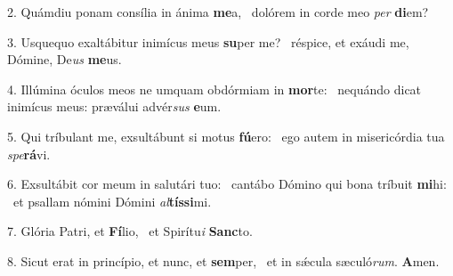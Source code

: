 2. Quámdiu ponam consília in ánima \textbf{me}a, \ast\  dolórem in corde meo \textit{per} \textbf{di}em?\

3. Usquequo exaltábitur inimícus meus \textbf{su}per me? \ast\  réspice, et exáudi me, Dómine, De\textit{us} \textbf{me}us.\

4. Illúmina óculos meos ne umquam obdórmiam in \textbf{mor}te: \ast\  nequándo dicat inimícus meus: præválui advér\textit{sus} \textbf{e}um.\

5. Qui tríbulant me, exsultábunt si motus \textbf{fú}ero: \ast\  ego autem in misericórdia tua \textit{spe}\textbf{rá}vi.\

6. Exsultábit cor meum in salutári tuo: \dag\  cantábo Dómino qui bona tríbuit \textbf{mi}hi: \ast\  et psallam nómini Dómini \textit{al}\textbf{tís}\textbf{si}mi.\

7. Glória Patri, et \textbf{Fí}lio, \ast\  et Spirítu\textit{i} \textbf{Sanc}to.\

8. Sicut erat in princípio, et nunc, et \textbf{sem}per, \ast\  et in sǽcula sæculó\textit{rum}. \textbf{A}men.\

